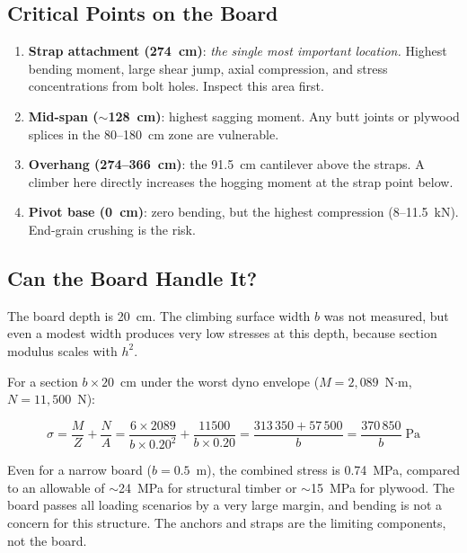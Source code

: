 \documentclass[12pt]{article}
\begin{document}
\subsection{Critical Points on the Board}

\begin{enumerate}
    \item \textbf{Strap attachment (274~cm)}: \textit{the single most important location.} Highest bending moment, large shear jump, axial compression, and stress concentrations from bolt holes. Inspect this area first.

    \item \textbf{Mid-span ($\sim$128~cm)}: highest sagging moment. Any butt joints or plywood splices in the 80--180~cm zone are vulnerable.

    \item \textbf{Overhang (274--366~cm)}: the 91.5~cm cantilever above the straps. A climber here directly increases the hogging moment at the strap point below.

    \item \textbf{Pivot base (0~cm)}: zero bending, but the highest compression (8--11.5~kN). End-grain crushing is the risk.
\end{enumerate}

\subsection{Can the Board Handle It?}
\label{sec:section_check}

The board depth is 20~cm. The climbing surface width $b$ was not measured, but even a modest width produces very low stresses at this depth, because section modulus scales with $h^2$.

For a section $b \times 20$~cm under the worst dyno envelope ($M = 2{,}089$~N$\cdot$m, $N = 11{,}500$~N):

\[
\sigma = \frac{M}{Z} + \frac{N}{A}
= \frac{6 \times 2089}{b \times 0.20^2} + \frac{11500}{b \times 0.20}
= \frac{313\,350 + 57\,500}{b}
= \frac{370\,850}{b} \;\text{Pa}
\]

Even for a narrow board ($b = 0.5$~m), the combined stress is 0.74~MPa, compared to an allowable of $\sim$24~MPa for structural timber or $\sim$15~MPa for plywood. The board passes all loading scenarios by a very large margin, and bending is not a concern for this structure. The anchors and straps are the limiting components, not the board.

\end{document}
